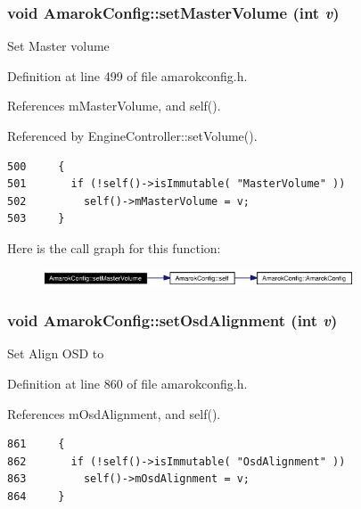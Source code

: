 \subsubsection{\setlength{\rightskip}{0pt plus 5cm}void Amarok\-Config::set\-Master\-Volume (int {\em v})\hspace{0.3cm}{\tt  [inline, static]}}\label{classAmarokConfig_AmarokConfige51}


Set Master volume 

Definition at line 499 of file amarokconfig.h.

References m\-Master\-Volume, and self().

Referenced by Engine\-Controller::set\-Volume().



\footnotesize\begin{verbatim}500     {
501       if (!self()->isImmutable( "MasterVolume" ))
502         self()->mMasterVolume = v;
503     }
\end{verbatim}\normalsize 


Here is the call graph for this function:\begin{figure}[H]
\begin{center}
\leavevmode
\includegraphics[width=262pt]{classAmarokConfig_AmarokConfige51_cgraph}
\end{center}
\end{figure}
\subsubsection{\setlength{\rightskip}{0pt plus 5cm}void Amarok\-Config::set\-Osd\-Alignment (int {\em v})\hspace{0.3cm}{\tt  [inline, static]}}\label{classAmarokConfig_AmarokConfige89}


Set Align OSD to 

Definition at line 860 of file amarokconfig.h.

References m\-Osd\-Alignment, and self().



\footnotesize\begin{verbatim}861     {
862       if (!self()->isImmutable( "OsdAlignment" ))
863         self()->mOsdAlignment = v;
864     }
\end{verbatim}\normalsize 


